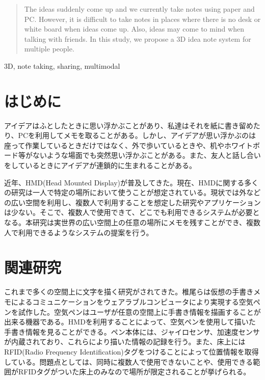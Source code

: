 \documentclass{hissymp}
\begin{document}

\begin{abstract}
The ideas suddenly come up and we currently take notes using paper and PC. However, it is difficult to take notes in places where there is no desk or white board  when ideas come up. Also, ideas may come to mind when talking with friends. In this study, we propose a 3D idea note system for multiple people.
\end{abstract}

\begin{keyword}	
3D, note taking, sharing, multimodal
\end{keyword}

\maketitle	



\section{はじめに}
アイデアはふとしたときに思い浮かぶことがあり、私達はそれを紙に書き留めたり、PCを利用してメモを取ることがある。しかし、アイデアが思い浮かぶのは座って作業しているときだけではなく、外で歩いているときや、机やホワイトボード等がないような場面でも突然思い浮かぶことがある。また、友人と話し合いをしているときにアイデアが連鎖的に生まれることがある。

近年、HMD(Head Mounted Display)が普及してきた。現在、HMDに関する多くの研究は一人で特定の場所において使うことが想定されている。現状では外などの広い空間を利用し、複数人で利用することを想定した研究やアプリケーションは少ない。そこで、複数人で使用できて、どこでも利用できるシステムが必要となる。本研究は実世界の広い空間上の任意の場所にメモを残すことができ、複数人で利用できるようなシステムの提案を行う。


\section{関連研究}
これまで多くの空間上に文字を描く研究がされてきた。椎尾ら\cite{tex1,tex2}は仮想の手書きメモによるコミュニケーションをウェアラブルコンピュータにより実現する空気ペンを試作した。空気ペンはユーザが任意の空間上に手書き情報を描画することが出来る機器である。HMDを利用することによって、空気ペンを使用して描いた手書き情報を見ることができる。ペン本体には、ジャイロセンサ、加速度センサが内蔵されており、これらにより描いた情報の記録を行う。また、床上にはRFID(Radio Frequency Identification)タグをつけることによって位置情報を取得している。問題点としては、同時に複数人で使用できないことや、使用できる範囲がRFIDタグがついた床上のみなので場所が限定されることが挙げられる。
\end{document}

